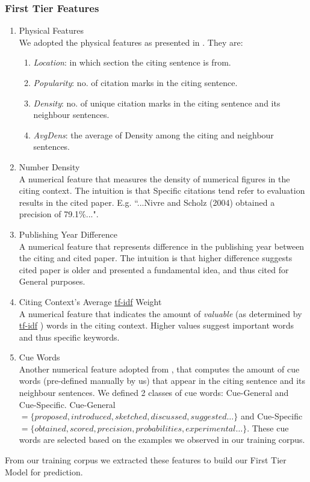 \subsubsection{First Tier Features}
\begin{enumerate}
\item Physical Features \\
We adopted the physical features as presented in \cite{dongensemble}. They are:
\begin{enumerate}
\item \textit{Location}: in which section the citing sentence is from.
\item \textit{Popularity}: no. of citation marks in the citing sentence.
\item \textit{Density}: no. of unique citation marks in the citing sentence and its neighbour sentences.
\item \textit{AvgDens}: the average of Density among the citing and neighbour sentences.
\end{enumerate}

\item Number Density \\
A numerical feature that measures the density of numerical figures in the citing context. The intuition is that Specific citations tend refer to evaluation results in the cited paper. E.g. ``...Nivre and Scholz (2004) obtained a precision of 79.1\%...".

\item Publishing Year Difference \\
A numerical feature that represents difference in the publishing year between the citing and cited paper. The intuition is that higher difference suggests cited paper is older and presented a fundamental idea, and thus cited for General purposes.

\item Citing Context's Average \url{tf-idf} Weight \\
A numerical feature that indicates the amount of \textit{valuable} (as determined by \url{tf-idf} \cite{irtextbook}) words in the citing context. Higher values suggest important words and thus specific keywords.

\item Cue Words \\
Another numerical feature adopted from \cite{dongensemble}, that computes the amount of cue words (pre-defined manually by us) that appear in the citing sentence and its neighbour sentences. We defined 2 classes of cue words: Cue-General and Cue-Specific. Cue-General $ = \{proposed, introduced, sketched, discussed, suggested\ldots \}$ and Cue-Specific $ = \{obtained, scored, precision, probabilities, experimental\ldots \}$. These cue words are selected based on the examples we observed in our training corpus.
\end{enumerate}
From our training corpus we extracted these features to build our First Tier Model for prediction.

